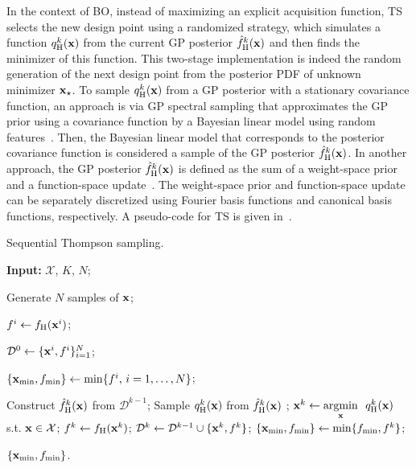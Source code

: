 \documentclass[iicol,sn-basic]{sn-jnl}%
\newcommand{\edit}[1]{\textcolor{red}{#1}} %
\begin{document}
In the context of BO, instead of maximizing an explicit acquisition function, TS selects the new design point using a randomized strategy, which simulates a function $q_\text{H}^k({\bf x})$ from the current GP posterior $\hat{f}_\text{H}^k({\bf x})$ and then finds the minimizer of this function.
{This two-stage implementation is indeed the random generation of the next design point from the posterior PDF of unknown minimizer ${\bf x}_\star$.}
To sample $q_\text{H}^k({\bf x})$ from a GP posterior with a stationary covariance function, an approach is via GP spectral sampling that approximates the GP prior using a covariance function by a Bayesian linear model using random features~\citep{HernandezLobato2014}.
Then, the Bayesian linear model that corresponds to the posterior covariance function is considered a sample of the GP posterior $\hat{f}_\text{H}^k({\bf x})$.
In another approach, the GP posterior $\hat{f}_\text{H}^k({\bf x})$ is defined as the sum of a weight-space prior and a function-space update~\citep{Wilson2020}.
The weight-space prior and function-space update can be separately discretized using Fourier basis functions and canonical basis functions, respectively. 
A pseudo-code for TS is given in~.

\begin{algorithm}
	\caption{Sequential Thompson sampling.}\label{Algo2}
	\begin{algorithmic}[1]
		\State \textbf{Input:} $\mathcal{X}$, $K$, $N$;
		
		\State Generate $N$ samples of ${\bf x}$;
		
		\State $f^i \gets f_\text{H}({\bf x}^i)$; \textcolor{black}{}
		\EndFor
		
		\State $\mathcal{D}^0 \gets \{{\bf x}^i,f^i\}_{i=1}^N$;
		
		\State $\{{\bf x}_{\min},f_{\min}\} \gets \min\{f^i,\, i=1,\dots, N\}$;
		
		\State Construct $\hat{f}_\text{H}^k({\bf x})$ from $\mathcal{D}^{k-1}$;
		\State Sample $q_\text{H}^k({\bf x})$ from $\hat{f}_\text{H}^k({\bf x})$ \label{Algo2:10}; 
		\State ${\bf x}^{k} \gets \underset{{\bf x}}{\mathrm{argmin}} \ \ q_\text{H}^k({\bf x})$ s.t. ${\bf x} \in \mathcal{X}$;
		\State $f^{k} \gets f_\text{H}({\bf x}^{k})$;
		\textcolor{black}{}
		\State $\mathcal{D}^k\gets\mathcal{D}^{k-1} \cup \{{\bf x}^{k},f^{k}\}$;
		\State $\{{\bf x}_{\min},f_{\min}\} \gets \min\{f_{\min},f^{k}\}$;
		\EndFor
		
		\State \Return $\{{\bf x}_{\min},f_{\min}\}$.
	\end{algorithmic}
\end{algorithm}
\end{document}
